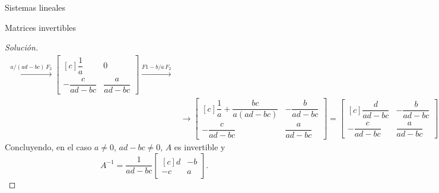 \documentclass[a4paper,12pt,twoside,spanish]{amsbook}
\theoremstyle{definition}
\theoremstyle{remark}
\begin{document}
\begin{chapter}{Sistemas lineales}
\begin{section}{Matrices invertibles}
\begin{proof}[Solución]
\begin{align*}
				\stackrel{a/(ad-bc)\,F_2}{\longrightarrow}
				\begin{bmatrix*}[c]\dfrac1a&0\\[8pt]-\dfrac{c}{ad-bc}&\dfrac{a}{ad-bc}\end{bmatrix*}
				\stackrel{F1-b/a\,F_2}{\longrightarrow}
				\\&\longrightarrow			
				\begin{bmatrix*}[c]\dfrac1a+\dfrac{bc}{a(ad-bc)}&-\dfrac{b}{ad-bc}\\[8pt]-\dfrac{c}{ad-bc}&\dfrac{a}{ad-bc}\end{bmatrix*} 
				=
				\begin{bmatrix*}[c]\dfrac{d}{ad-bc}&-\dfrac{b}{ad-bc}\\[8pt]-\dfrac{c}{ad-bc}&\dfrac{a}{ad-bc}\end{bmatrix*} .
				\end{align*}  
				Concluyendo, en el caso $a\not=0$, $ad-bc\not=0$, $A$  es invertible y 
				\begin{equation}\label{inv-2x2}
				A^{-1} = \dfrac{1}{ad-bc}
				\begin{bmatrix*}[c]d&-b\\-c&a\end{bmatrix*}.
				\end{equation}
				

\end{proof}
\end{section}
\end{chapter}
\end{document}
